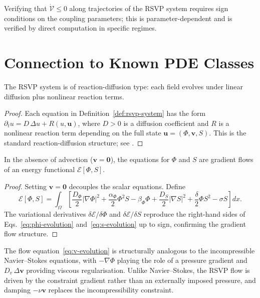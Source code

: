 \documentclass[11pt,openany]{book}
\begin{document}
Verifying that $\dot{\mathcal{V}} \le 0$ along trajectories
of the RSVP system requires sign conditions on the coupling
parameters; this is parameter-dependent and is verified by
direct computation in specific regimes.

\section{Connection to Known PDE Classes}
\label{sec:pde-connection}

\begin{proposition}
The RSVP system is of reaction-diffusion type: each field
evolves under linear diffusion plus nonlinear reaction
terms.
\end{proposition}

\begin{proof}
Each equation in Definition~\ref{def:rsvp-system} has the
form $\partial_t u = D\,\Delta u + R(u, \mathbf{u})$, where
$D > 0$ is a diffusion coefficient and $R$ is a nonlinear
reaction term depending on the full state $\mathbf{u} =
(\Phi, \boldsymbol{v}, S)$.  This is the standard
reaction-diffusion structure; see \citep{evans2010partial}.
\end{proof}

\begin{proposition}
In the absence of advection ($\boldsymbol{v} = \mathbf{0}$),
the equations for $\Phi$ and $S$ are gradient flows of an
energy functional $\mathcal{E}[\Phi, S]$.
\end{proposition}

\begin{proof}
Setting $\boldsymbol{v} = \mathbf{0}$ decouples the scalar
equations.  Define
\[
  \mathcal{E}[\Phi, S] = \int_\Omega \left[
    \frac{D_\Phi}{2}|\nabla\Phi|^2
    + \frac{\alpha_\Phi}{2}\Phi^2 S
    - \beta_\Phi \Phi
    + \frac{D_S}{2}|\nabla S|^2
    + \frac{\delta}{2}\Phi S^2
    - \sigma S
  \right] dx.
\]
The variational derivatives $\delta\mathcal{E}/\delta\Phi$
and $\delta\mathcal{E}/\delta S$ reproduce the right-hand
sides of Eqs.~\eqref{eq:phi-evolution}
and~\eqref{eq:s-evolution} up to sign, confirming the
gradient flow structure.
\end{proof}

\begin{remark}
The flow equation~\eqref{eq:v-evolution} is structurally
analogous to the incompressible Navier--Stokes equations,
with $-\nabla\Phi$ playing the role of a pressure gradient
and $D_v\,\Delta\boldsymbol{v}$ providing viscous
regularisation.  Unlike Navier--Stokes, the RSVP flow is
driven by the constraint gradient rather than an
externally imposed pressure, and damping $-\nu\boldsymbol{v}$
replaces the incompressibility constraint.
\end{remark}
\end{document}
